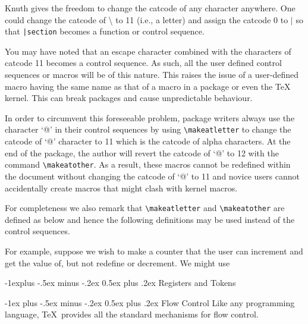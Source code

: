 \documentclass[10pt,landscape,letterpaper]{article}
\makeatletter
\renewcommand{\section}{\@startsection{section}{1}{0mm}%
	{.2ex}%
	{.2ex}%
	{\sffamily\bfseries}}
\renewcommand{\section}{\@startsection{section}{1}{0mm}%
	{-1ex plus -.5ex minus -.2ex}%
	{0.5ex plus .2ex}%
	{\normalfont\large\bfseries}}
\renewcommand{\subsection}{\@startsection{subsection}{2}{0mm}%
	{-1explus -.5ex minus -.2ex}%
	{0.5ex plus .2ex}%
	{\normalfont\normalsize\bfseries}}
\makeatother
\begin{document}
\begin{multicols*}{3}
Knuth gives the freedom to change the catcode of any character anywhere. One could change the catcode of \textbackslash{} to 11 (i.e., a letter) and assign the catcode 0 to $|$ so that \verb+|section+ becomes a function or control sequence.

You may have noted that an escape character combined with the characters of catcode 11 becomes a control sequence. As such, all the user defined control sequences or macros will be of this nature. This raises the issue of a user-defined macro having the same name as that of a macro in a package or even the \TeX{} kernel. This can break packages and cause unpredictable behaviour.

In order to circumvent this foreseeable problem, package writers always use the character `@' in their control sequences by using \verb|\makeatletter| to change the catcode of `@' character to 11 which is the catcode of alpha characters. At the end of the package, the author will revert the catcode of `@' to 12 with the command \verb|\makeatother|. As a result, these macros cannot be redefined within the document without changing the catcode of `@' to 11 and novice users cannot accidentally create macros that might clash with kernel macros. 

For completeness we also remark that \verb|\makeatletter| and \verb|\makeatother| are defined as below and hence the following definitions may be used instead of the control sequences.
\begin{macrocode}
\def\makeatletter{\catcode`\@11\relax}
\def\makeatother{\catcode`\@12\relax}
\end{macrocode}
For example, suppose we wish to make a counter that the user can increment and get the value of, but not redefine or decrement. We might use
\begin{macrocode}
\makeatletter
\newcount\@counta
{}
\def\addtocounta{\advance\@counta by 1\relax}
\def\countaval{\the\@counta}
\makeatother
\end{macrocode}

\subsection{Registers and Tokens}


\section{Flow Control}
Like any programming language, \TeX\ provides all the standard mechanisms for flow control.

\end{multicols*}
\end{document}
